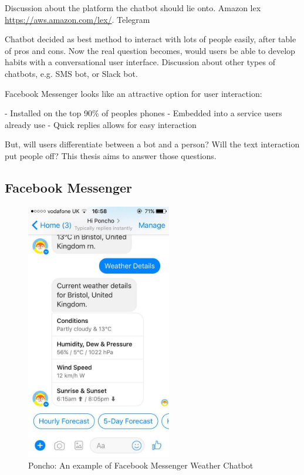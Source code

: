 Discussion about the platform the chatbot should lie onto. Amazon lex \url{https://aws.amazon.com/lex/}. Telegram


Chatbot decided as best method to interact with lots of people easily, after table of pros and cons. Now the real question becomes, would users be able to develop habits with a conversational user interface. Discussion about other types of chatbots, e.g. SMS bot, or Slack bot.


Facebook Messenger looks like an attractive option for user interaction:

- Installed on the top 90\% of peoples phones
- Embedded into a service users already use
- Quick replies allows for easy interaction

But, will users differentiate between a bot and a person? Will the text interaction put people off? This thesis aims to answer those questions.

\subsection{Facebook Messenger}

\begin{figure}[ht] %
    \centering
    \includegraphics[width=2.5in]{../resources/poncho.jpg}
    \caption{Poncho: An example of Facebook Messenger Weather Chatbot}
    \label{fig:poncho}
\end{figure}


